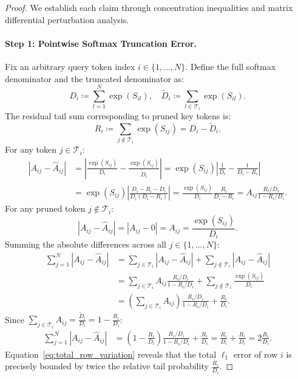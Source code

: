 \begin{proof}
We establish each claim through concentration inequalities and matrix differential perturbation analysis.

\paragraph{Step 1: Pointwise Softmax Truncation Error.}
Fix an arbitrary query token index $i \in \{1, \dots, N\}$.
Define the full softmax denominator and the truncated denominator as:
\begin{equation}
D_i \coloneqq \sum_{l=1}^N \exp(S_{il}), \quad \widetilde{D}_i \coloneqq \sum_{l \in \mathcal{T}_i} \exp(S_{il}).
\end{equation}
The residual tail sum corresponding to pruned key tokens is:
\begin{equation}
R_i \coloneqq \sum_{j \notin \mathcal{T}_i} \exp(S_{ij}) = D_i - \widetilde{D}_i.
\end{equation}
For any token $j \in \mathcal{T}_i$:
\begin{align}
|A_{ij} - \widehat{A}_{ij}| &= \left| \frac{\exp(S_{ij})}{D_i} - \frac{\exp(S_{ij})}{\widetilde{D}_i} \right| = \exp(S_{ij}) \left| \frac{1}{D_i} - \frac{1}{D_i - R_i} \right| \nonumber \\
&= \exp(S_{ij}) \left| \frac{D_i - R_i - D_i}{D_i (D_i - R_i)} \right| = \frac{\exp(S_{ij})}{D_i} \frac{R_i}{D_i - R_i} = A_{ij} \frac{R_i / D_i}{1 - R_i / D_i}.
\label{eq:active_token_diff}
\end{align}
For any pruned token $j \notin \mathcal{T}_i$:
\begin{equation}
|A_{ij} - \widehat{A}_{ij}| = |A_{ij} - 0| = A_{ij} = \frac{\exp(S_{ij})}{D_i}.
\label{eq:pruned_token_diff}
\end{equation}
Summing the absolute differences across all $j \in \{1, \dots, N\}$:
\begin{align}
\sum_{j=1}^N |A_{ij} - \widehat{A}_{ij}| &= \sum_{j \in \mathcal{T}_i} |A_{ij} - \widehat{A}_{ij}| + \sum_{j \notin \mathcal{T}_i} |A_{ij} - \widehat{A}_{ij}| \nonumber \\
&= \sum_{j \in \mathcal{T}_i} A_{ij} \frac{R_i / D_i}{1 - R_i / D_i} + \sum_{j \notin \mathcal{T}_i} \frac{\exp(S_{ij})}{D_i} \nonumber \\
&= \left( \sum_{j \in \mathcal{T}_i} A_{ij} \right) \frac{R_i / D_i}{1 - R_i / D_i} + \frac{R_i}{D_i}.
\end{align}
Since $\sum_{j \in \mathcal{T}_i} A_{ij} = \frac{\widetilde{D}_i}{D_i} = 1 - \frac{R_i}{D_i}$:
\begin{align}
\sum_{j=1}^N |A_{ij} - \widehat{A}_{ij}| &= \left(1 - \frac{R_i}{D_i}\right) \frac{R_i / D_i}{1 - R_i / D_i} + \frac{R_i}{D_i} = \frac{R_i}{D_i} + \frac{R_i}{D_i} = 2 \frac{R_i}{D_i}.
\label{eq:total_row_variation}
\end{align}
Equation~\eqref{eq:total_row_variation} reveals that the total $\ell_1$ error of row $i$ is precisely bounded by twice the relative tail probability $\frac{R_i}{D_i}$.


\end{proof}
